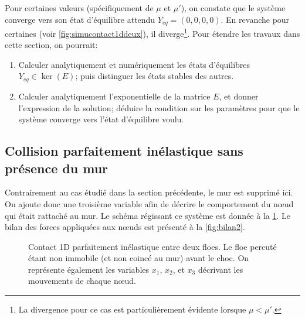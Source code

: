 \noindent Pour certaines valeurs (spécifiquement de $\mu$ et $\mu'$), on constate que le système converge vers son état d'équilibre attendu $Y_{eq} = (0,0,0,0)$. En revanche pour certaines (voir \cref{fig:simucontact1ddeux}), il diverge\footnote{La divergence pour ce cas est particulièrement évidente lorsque $\mu < \mu'$.}. Pour étendre les travaux dans cette section, on pourrait:
\begin{enumerate}
    \item Calculer analytiquement et numériquement les états d'équilibres $Y_{eq} \in \ker(E)$; puis distinguer les états stables des autres.
    \item Calculer analytiquement l'exponentielle de la matrice $E$, et donner l'expression de la solution; déduire la condition sur les paramètres pour que le système converge vers l'état d'équilibre voulu.
\end{enumerate} 








\subsection{Collision parfaitement inélastique sans présence du mur}

Contrairement au cas étudié dans la section précédente, le mur est supprimé ici. On ajoute donc une troisième variable afin de décrire le comportement du n\oe{}ud qui était rattaché au mur. Le schéma régissant ce système est donnée à la \cref{fig:contact1d2}. Le bilan des forces appliquées aux n\oe{}uds est présenté à la \cref{fig:bilan2}.

\begin{figure}[!h]
    \centering
    \caption{Contact 1D parfaitement inélastique entre deux floes. Le floe percuté étant non immobile (et non coincé au mur) avant le choc. On représente également les variables $x_1$, $x_2$, et $x_3$ décrivant les mouvements de chaque n\oe{}ud.}
    \label{fig:contact1d2}
\end{figure}

